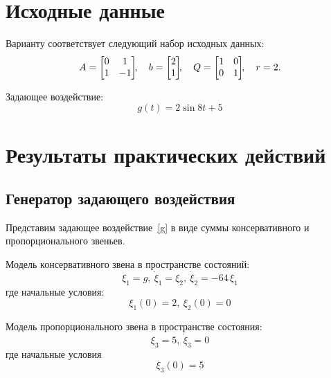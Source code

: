 \section{Исходные данные}
Варианту  соответствует следующий набор исходных данных:
\begin{equation}
    A =
    \begin{bmatrix}
        0 &  1 \\
        1 & -1
    \end{bmatrix}\!\!,
    \quad
    b =
    \begin{bmatrix}
        2 \\ 1
    \end{bmatrix}\!\!,
    \quad
    Q =
    \begin{bmatrix}
        1 & 0 \\
        0 & 1
    \end{bmatrix}\!\!,
    \quad
    r = 2 \ldotp
\end{equation}

Задающее воздействие:
\begin{equation}\label{g}
	g(t) = 2 \sin{8 t} + 5
\end{equation}

\vspace{0.3cm}
\section{Результаты практических действий}
\subsection{Генератор задающего воздействия}
Представим задающее воздействие~\eqref{g} в виде суммы консервативного и пропорционального звеньев.

Модель консервативного звена в пространстве состояний:
\begin{equation}\label{g1}
	\xi_1 = g,~\dot{\xi}_1 = \xi_2,~\dot{\xi}_2 = - 64\,\xi_1  
\end{equation}
где начальные условия:
\begin{equation}
	\xi_1(0) = 2,~\xi_2(0) = 0
\end{equation}

Модель пропорционального звена в пространстве состояния:
\begin{equation}\label{g2}
	\xi_3 = 5,~\dot{\xi}_3 = 0
\end{equation}
где начальные условия
\begin{equation}
	\xi_3(0) = 5
\end{equation}

